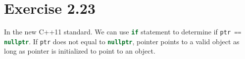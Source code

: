 \documentclass{article}
\begin{document}
\section*{Exercise 2.23}

\begin{flushleft}
In the new C++11 standard. We can use \lstinline[language=C++]|if| statement to determine if \lstinline[language=C++]|ptr == nullptr|. If \lstinline[language=C++]|ptr| does not equal to \lstinline[language=C++]|nullptr|, pointer points to a valid object as long as pointer is initialized to point to an object.
\end{flushleft}
\end{document}
